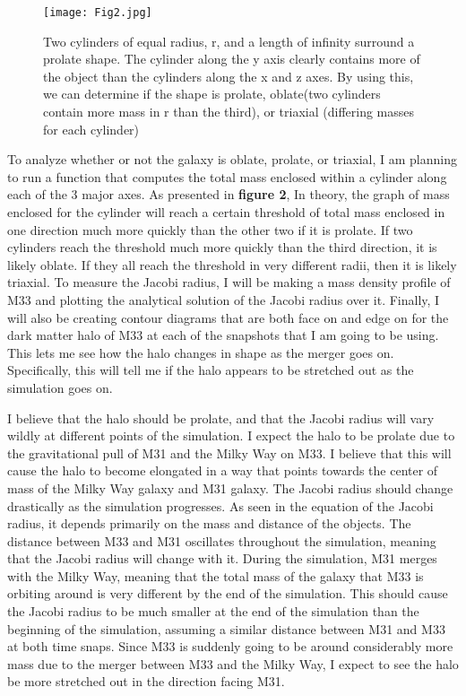 \documentclass[fleqn,usenatbib]{mnras}
\begin{document}
\begin{figure}
                \centering
                \texttt{[image: Fig2.jpg]}
                \label{fig:enter-label}
            \caption{ Two cylinders of equal radius, r, and a length of infinity surround a prolate shape. The cylinder along the y axis clearly contains more of the object than the cylinders along the x and z axes. By using this, we can determine if the shape is prolate, oblate(two cylinders contain more mass in r than the third), or triaxial (differing masses for each cylinder)}
            \end{figure}
        To analyze whether or not the galaxy is oblate, prolate, or triaxial, I am planning to run a function that computes the total mass enclosed within a cylinder along each of the 3 major axes. As presented in \textbf{figure 2}, In theory, the graph of mass enclosed for the cylinder will reach a certain threshold of total mass enclosed in one direction much more quickly than the other two if it is prolate. If two cylinders reach the threshold much more quickly than the third direction, it is likely oblate. If they all reach the threshold in very different radii, then it is likely triaxial. To measure the Jacobi radius, I will be making a mass density profile of M33 and plotting the analytical solution of the Jacobi radius over it. Finally, I will also be creating contour diagrams that are both face on and edge on for the dark matter halo of M33 at each of the snapshots that I am going to be using. This lets me see how the halo changes in shape as the merger goes on. Specifically, this will tell me if the halo appears to be stretched out as the simulation goes on.

        I believe that the halo should be prolate, and that the Jacobi radius will vary wildly at different points of the simulation. I expect the halo to be prolate due to the gravitational pull of M31 and the Milky Way on M33. I believe that this will cause the halo to become elongated in a way that points towards the center of mass of the Milky Way galaxy and M31 galaxy. The Jacobi radius should change drastically as the simulation progresses. As seen in the equation of the Jacobi radius, it depends primarily on the mass and distance of the objects. The distance between M33 and M31 oscillates throughout the simulation, meaning that the Jacobi radius will change with it. During the simulation, M31 merges with the Milky Way, meaning that the total mass of the galaxy that M33 is orbiting around is very different by the end of the simulation. This should cause the Jacobi radius to be much smaller at the end of the simulation than the beginning of the simulation, assuming a similar distance between M31 and M33 at both time snaps. Since M33 is suddenly going to be around considerably more mass due to the merger between M33 and the Milky Way, I expect to see the halo be more stretched out in the direction facing M31.




 
\cite{}
\label{lastpage}
\end{document}
